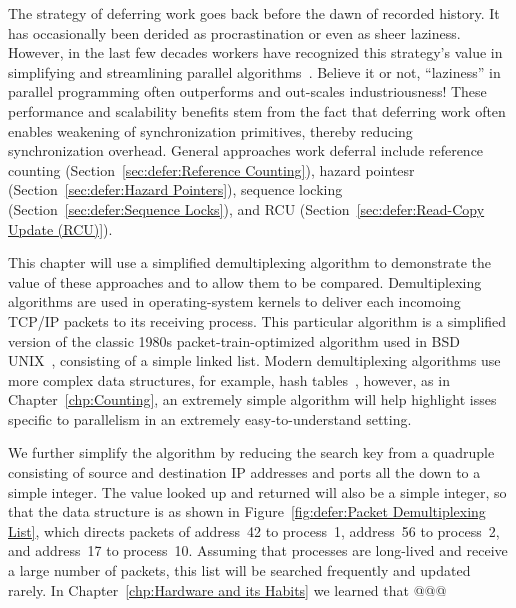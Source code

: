

The strategy of deferring work goes back before the dawn of recorded
history. It has occasionally been derided as procrastination or
even as sheer laziness.
However, in the last few decades workers have recognized this strategy's value
in simplifying and streamlining parallel algorithms~\cite{Kung80,HMassalinPhD}.
Believe it or not, ``laziness'' in parallel programming often outperforms and
out-scales industriousness!
These performance and scalability benefits stem from the fact that
deferring work often enables weakening of synchronization primitives,
thereby reducing synchronization overhead.
General approaches work deferral include
reference counting (Section~\ref{sec:defer:Reference Counting}),
hazard pointesr (Section~\ref{sec:defer:Hazard Pointers}),
sequence locking (Section~\ref{sec:defer:Sequence Locks}),
and RCU (Section~\ref{sec:defer:Read-Copy Update (RCU)}).

This chapter will use a simplified demultiplexing algorithm to demonstrate
the value of these approaches and to allow them to be compared.
Demultiplexing algorithms are used in operating-system kernels to
deliver each incomoing TCP/IP packets to its receiving process.
This particular algorithm is a simplified version of the classic 1980s
packet-train-optimized algorithm used in BSD UNIX~\cite{VanJacobson88},
consisting of a simple linked list.
Modern demultiplexing algorithms use more complex data structures,
for example, hash tables~\cite{McKenney92b}, however, as in
Chapter~\ref{chp:Counting}, an extremely simple algorithm will
help highlight isses specific to parallelism in an extremely
easy-to-understand setting.

We further simplify the algorithm by reducing the search key from
a quadruple consisting of source and destination IP addresses and
ports all the down to a simple integer.
The value looked up and returned will also be a simple integer,
so that the data structure is as shown in
Figure~\ref{fig:defer:Packet Demultiplexing List}, which
directs packets of address~42 to process~1, address~56 to
process~2, and address~17 to process~10.
Assuming that processes are long-lived and receive a large number
of packets, this list will be searched frequently and updated
rarely.
In Chapter~\ref{chp:Hardware and its Habits}
we learned that @@@

